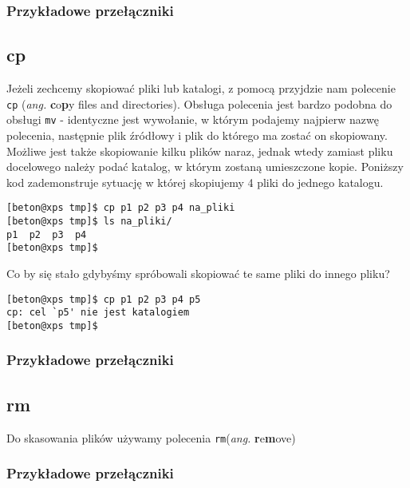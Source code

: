 \subsubsection*{Przykładowe przełączniki}

\subsection{cp}
Jeżeli zechcemy skopiować pliki lub katalogi, z pomocą przyjdzie nam polecenie \texttt{cp} (\textit{ang.} \textbf{c}o\textbf{p}y files and directories). Obsługa polecenia jest bardzo podobna do obsługi \texttt{mv} - identyczne jest wywołanie, w którym podajemy najpierw nazwę polecenia, następnie plik źródłowy i plik do którego ma zostać on skopiowany. Możliwe jest także skopiowanie kilku plików naraz, jednak wtedy zamiast pliku docelowego należy podać katalog, w którym zostaną umieszczone kopie. Poniższy kod zademonstruje sytuację w której skopiujemy 4 pliki do jednego katalogu.
\begin{verbatim}
[beton@xps tmp]$ cp p1 p2 p3 p4 na_pliki
[beton@xps tmp]$ ls na_pliki/
p1  p2  p3  p4
[beton@xps tmp]$ 
\end{verbatim}
Co by się stało gdybyśmy spróbowali skopiować te same pliki do innego pliku?
\begin{verbatim}
[beton@xps tmp]$ cp p1 p2 p3 p4 p5
cp: cel `p5' nie jest katalogiem
[beton@xps tmp]$ 
\end{verbatim}
\subsubsection*{Przykładowe przełączniki}

\subsection{rm}
Do skasowania plików używamy polecenia \texttt{rm}(\textit{ang.} \textbf{r}e\textbf{m}ove)
\subsubsection*{Przykładowe przełączniki}

